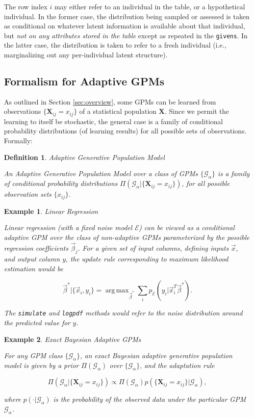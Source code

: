 \documentclass[10pt,letterpaper]{article}
\newtheorem{example}{Example}[section]
\newtheorem{definition}{Definition}[section]
\DeclareMathOperator{\argmax}{arg\,max}
\newcommand{\set}[1]{\{#1\}}
\newcommand{\G}{\mathcal{G}}
\begin{document}
The row index $i$ may either refer to an individual in the
table, or a hypothetical individual.  In the former case, the
distribution being sampled or assessed is taken as conditional on
whatever latent information is available about that individual, but
\emph{not on any attributes stored in the table} except as repeated in
the \texttt{givens}.  In the latter case, the distribution is taken to
refer to a fresh individual (i.e., marginalizing out any
per-individual latent structure).

\subsection{Formalism for Adaptive GPMs}
\label{sec:formalism-adaptive-gpm}

As outlined in Section \ref{sec:overview}, some GPMs can be learned
from observations $\set{\mathbf{X}_{ij} = x_{ij}}$ of a statistical population
$\mathbf{X}$.  Since we permit the learning to itself be stochastic,
the general case is a family of conditional probability distributions
(of learning results) for all possible sets of observations.  Formally:

\begin{definition} Adaptive Generative Population Model

An \emph{Adaptive Generative Population Model} over a class of GPMs
$\{\G_\alpha\}$ is a family of conditional probability distributions
$\Pi(\G_\alpha|\{\mathbf{X}_{ij} = x_{ij}\})$, for all possible
observation sets $\{x_{ij}\}$.
\end{definition}

\begin{example} Linear Regression

Linear regression (with a fixed noise model $\mathcal{E}$) can be viewed as a
conditional adaptive GPM over the class of non-adaptive GPMs
parameterized by the possible regression coefficients $\vec\beta_j$.
For a given set of input columns, defining inputs $\vec x$, and output column $y$,
the update rule corresponding to maximum likelihood estimation would be

\[ \vec\beta^*|\{\vec x_i, y_i\} = \argmax_{\vec\beta^*} \sum_i
   p_{\mathcal{E}}(y_i | \vec x_i^T \vec\beta^*). \]

The {\tt simulate} and {\tt logpdf} methods would refer to the
noise distribution around the predicted value for $y$.
\end{example}

\begin{example} Exact Bayesian Adaptive GPMs

For any GPM class $\{\G_\alpha\}$, an \emph{exact Bayesian adaptive
  generative population model} is given by a prior
$\Pi(\G_\alpha)$ over
$\{\G_\alpha\}$, and the adaptation rule

\[ \Pi(\G_\alpha|\set{\mathbf{X}_{ij} = x_{ij}}) \propto \Pi(\G_\alpha)
 p(\set{\mathbf{X}_{ij} = x_{ij}}|\G_\alpha), \]

where $p(\cdot|\G_\alpha)$ is the probability of the observed data under
the particular GPM $\G_\alpha$. \label{ex:exact-bayes}
\end{example}
\end{document}
